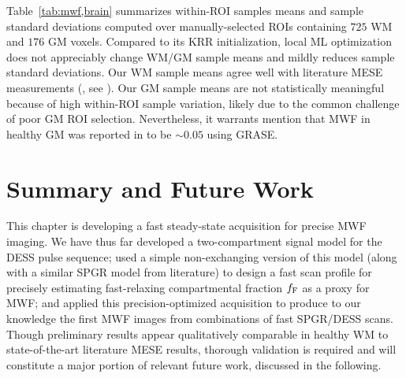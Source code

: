 Table~\ref{tab:mwf,brain} summarizes 
within-ROI samples means and sample standard deviations
computed over manually-selected ROIs 
containing $725$ WM and $176$ GM voxels.
Compared to its KRR initialization,
local ML optimization
does not appreciably change 
WM/GM \ffest sample means
and mildly reduces sample standard deviations.
Our WM \ffest sample means
agree well with literature MESE measurements
(\eg, see \cite[Fig.~3]{zhang:15:com}).
Our GM \ffest sample means
are not statistically meaningful
because of high within-ROI sample variation,
likely due to the common challenge
of poor GM ROI selection.
Nevertheless,
it warrants mention 
that MWF in healthy GM 
was reported in \cite[Fig.~3]{zhang:15:com}
to be $\sim0.05$ using GRASE.

\section{Summary and Future Work}
\label{s,mwf,summ}

This chapter is developing a fast steady-state acquisition
for precise MWF imaging.
We have thus far developed
a two-compartment signal model 
for the DESS pulse sequence;
used a simple non-exchanging version 
of this model 
(along with a similar SPGR model
from literature)
to design a fast scan profile
for precisely estimating 
fast-relaxing compartmental fraction $f_{\mathrm{F}}$
as a proxy for MWF;
and applied this precision-optimized acquisition
\invivo to produce to our knowledge the first MWF images 
from combinations of fast SPGR/DESS scans.
Though preliminary results appear qualitatively comparable
in healthy WM
to state-of-the-art literature MESE results,
thorough validation is required
and will constitute a major portion 
of relevant future work,
discussed in the following.

